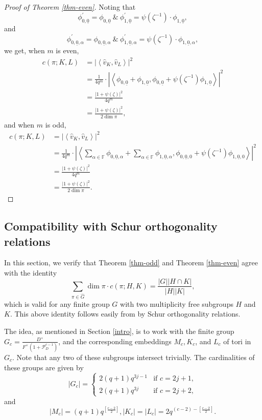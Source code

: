 \documentclass[12pt]{amsart}
\theoremstyle{definition}
\theoremstyle{remark}
\begin{document}
\begin{proof}[Proof of Theorem \ref{thm-even}]
Noting that
\[\phi_{0,\underline{0}}^\prime= \phi_{0,\underline{0}} ~\&~ \phi_{1,\underline{0}}^\prime= \psi(\zeta^{-1}) \cdot \phi_{1,\underline{0}},\]
and
\[\phi_{0,\underline{0},\alpha}^\prime= \phi_{0,\underline{0},\alpha } ~\&~ \phi_{1,\underline{0},\alpha}^\prime= \psi(\zeta^{-1}) \cdot \phi_{1,\underline{0}, \alpha },\]
we get, when $m$ is even,
\begin{align*}
c(\pi; K, L) &= |\left\langle \hat{v}_K, \hat{v}_L \right\rangle|^2\\
&= \frac{1}{4 q^{m}} \cdot |\left\langle  \phi_{0,\underline{0}} + \phi_{1,\underline{0}}, \phi_{0,\underline{0}} + \psi(\zeta^{-1}) \phi_{1,\underline{0}} \right\rangle|^2 \\
&= \frac{|1 + \psi(\zeta)|^2}{4 q^{m}}\\
&= \frac{|1 + \psi(\zeta)|^2}{2 \dim \pi},
\end{align*}
and when $m$ is odd,
\begin{align*}
c(\pi; K, L) &= |\left\langle \hat{v}_K, \hat{v}_L \right\rangle|^2 \\
&= \frac{1}{4 q^{m}} \cdot |\left\langle  \sum\limits_{\alpha \in \mathbb F} \phi_{0,\underline{0}, \alpha} + \sum\limits_{\alpha \in \mathbb F} \phi_{1,\underline{0}, \alpha}, \phi_{0,\underline{0}, 0} + \psi(\zeta^{-1})\phi_{1,\underline{0},0} \right\rangle |^2 \\
&= \frac{|1 + \psi(\zeta)|^2}{4 q^{m}}\\
&= \frac{|1 + \psi(\zeta)|^2}{2 \dim \pi}. 
\end{align*}
\end{proof}

\subsection{Compatibility with Schur orthogonality relations}\label{schur}

In this section, we verify that Theorem \ref{thm-odd} and Theorem \ref{thm-even} agree with the identity \cite[Equation (1) on p. 502]{aj22} 
\[\sum_{\pi \in \widehat{G}} \dim \pi \cdot c(\pi;H,K) = \frac{|G||H \cap K|}{|H||K|},\]
which is valid for any finite group $G$ with two multiplicity free subgroups $H$ and $K$. This above identity follows easily from \cite[Lemma 2.1]{aj22} by Schur orthogonality relations. 

The idea, as mentioned in Section \ref{intro}, is to work with the finite group $G_c = \frac{D^\times}{F^\times(1+\mathcal P_D^{c-1})}$, and the corresponding embeddings $M_c, K_c$, and $L_c$ of tori in $G_c$. Note that any two of these subgroups intersect trivially. The cardinalities of these groups are given by
\[|G_c| = \begin{cases}
2(q+1)q^{3j-1} &\text{if $c=2j+1$,} \\
2(q+1)q^{3j} &\text{if $c=2j+2$},
\end{cases}\] and
\[|M_c| = (q+1)q^{\left[\frac{c-2}{2} \right]}, |K_c|=|L_c| = 2q^{(c-2)-\left[\frac{c-2}{2}\right]}.\]
\end{document}
